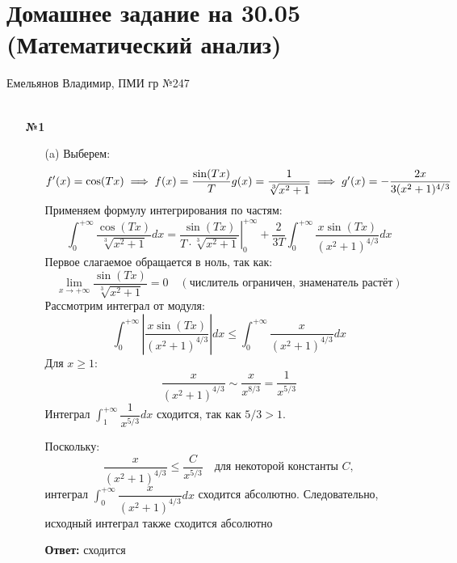 \documentclass[a4paper]{article}
\renewcommand{\geq}{\geqslant}
\renewcommand{\leq}{\leqslant}
\begin{document}
\section*{Домашнее задание на 30.05 (Математический анализ)}
{\large Емельянов Владимир, ПМИ гр №247}\\\\
\begin{enumerate}
  \item[\textbf{№1}]\begin{enumerate}
    \item[(a)]
    Выберем:  
     \[
     f'(x) = \cos(Tx) \implies f(x) = \dfrac{\sin(Tx)}{T} $$
     $$ g(x) =
      \dfrac{1}{\sqrt[3]{x^2 + 1}} \implies g'(x) = -\dfrac{2x}{3(x^2 + 1)^{4/3}}
     \]  
     Применяем формулу интегрирования по частям:  
     \[
     \int_{0}^{+\infty} \dfrac{\cos(Tx)}{\sqrt[3]{x^2 + 1}} dx = 
     \left. \dfrac{\sin(Tx)}{T \cdot \sqrt[3]{x^2 + 1}} \right|_{0}^{+\infty} +
      \dfrac{2}{3T} \int_{0}^{+\infty} \dfrac{x \sin(Tx)}{(x^2 + 1)^{4/3}} dx
     \]  
     Первое слагаемое обращается в ноль, так как:  
     \[
     \lim_{x \to +\infty} \dfrac{\sin(Tx)}{\sqrt[3]{x^2 + 1}} =
      0 \quad (\text{числитель ограничен, знаменатель растёт})
     \]
     Рассмотрим интеграл от модуля:  
     \[
     \int_{0}^{+\infty} \left| \dfrac{x \sin(Tx)}{(x^2 + 1)^{4/3}}
      \right| dx \leq \int_{0}^{+\infty} \dfrac{x}{(x^2 + 1)^{4/3}} dx
     \]  
     Для \(x \geq 1\):  
     \[
     \dfrac{x}{(x^2 + 1)^{4/3}} \sim \dfrac{x}{x^{8/3}} = \dfrac{1}{x^{5/3}}
     \]  
     Интеграл \(\int_{1}^{+\infty} \dfrac{1}{x^{5/3}} dx\) сходится, так как \(5/3 > 1\).
  
      Поскольку:  
     \[
     \dfrac{x}{(x^2 + 1)^{4/3}} \leq \dfrac{C}{x^{5/3}} \quad 
     \text{для некоторой константы } C,
     \]  
     интеграл \(\int_{0}^{+\infty} \dfrac{x}{(x^2 + 1)^{4/3}} dx\) сходится абсолютно. 
     Следовательно, исходный интеграл также сходится абсолютно
    
     \textbf{Ответ: } сходится
  \end{enumerate}
  
\end{enumerate}
\end{document}
